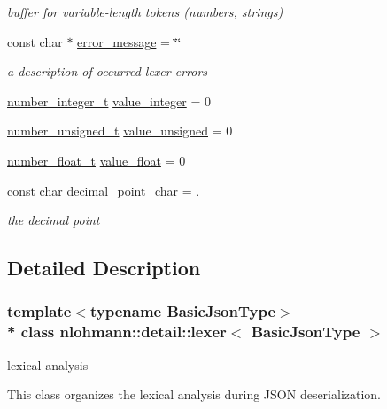 \begin{DoxyCompactItemize}
\begin{DoxyCompactList}\small\item\em buffer for variable-\/length tokens (numbers, strings) \end{DoxyCompactList}\item 
const char $\ast$ \hyperlink{classnlohmann_1_1detail_1_1lexer_ae2a15e440f1889e0ab0c6a35344e48df}{error\+\_\+message} = \char`\"{}\char`\"{}
\begin{DoxyCompactList}\small\item\em a description of occurred lexer errors \end{DoxyCompactList}\item 
\hyperlink{classnlohmann_1_1detail_1_1lexer_a9cd1b11cc67edbfb2613c788b5bd337c}{number\+\_\+integer\+\_\+t} \hyperlink{classnlohmann_1_1detail_1_1lexer_a353d8eeca5b2f21b3e88540c17afb9bc}{value\+\_\+integer} = 0
\item 
\hyperlink{classnlohmann_1_1detail_1_1lexer_a105d1dfeab414a572655895cdd96a52a}{number\+\_\+unsigned\+\_\+t} \hyperlink{classnlohmann_1_1detail_1_1lexer_af250180459c23ca71c3e10a99fb5ba3e}{value\+\_\+unsigned} = 0
\item 
\hyperlink{classnlohmann_1_1detail_1_1lexer_aa7f9e7b2bcd311fb86e2da43761a6619}{number\+\_\+float\+\_\+t} \hyperlink{classnlohmann_1_1detail_1_1lexer_a861ce804da2d257ee373d1e0b55780e1}{value\+\_\+float} = 0
\item 
const char \hyperlink{classnlohmann_1_1detail_1_1lexer_a16593b0475f6d1cddd5eaf7c045771f3}{decimal\+\_\+point\+\_\+char} = \textquotesingle{}.\textquotesingle{}
\begin{DoxyCompactList}\small\item\em the decimal point \end{DoxyCompactList}\end{DoxyCompactItemize}


\subsection{Detailed Description}
\subsubsection*{template$<$typename Basic\+Json\+Type$>$\\*
class nlohmann\+::detail\+::lexer$<$ Basic\+Json\+Type $>$}

lexical analysis 

This class organizes the lexical analysis during J\+S\+ON deserialization. 

